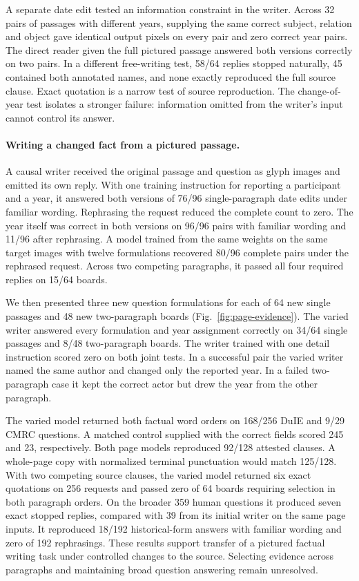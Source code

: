 \documentclass[12pt,a4paper]{article}
\providecommand{\DIFadd}[1]{{\protect\color{blue} \sf #1}} %
\begin{document}
\DIFadd{A separate date edit tested an information constraint in the writer. Across 32 pairs of passages with different years, supplying the same correct subject, relation and object gave identical output pixels on every pair and zero correct year pairs. The direct reader given the full pictured passage answered both versions correctly on two pairs. In a different free-writing test, 58/64 replies stopped naturally, 45 contained both annotated names, and none exactly reproduced the full source clause. Exact quotation is a narrow test of source reproduction. The change-of-year test isolates a stronger failure: information omitted from the writer's input cannot control its answer.
}


\paragraph{\DIFadd{Writing a changed fact from a pictured passage.}}
\DIFadd{A causal writer received the original passage and question as glyph images and emitted its own reply. With one training instruction for reporting a participant and a year, it answered both versions of 76/96 single-paragraph date edits under familiar wording. Rephrasing the request reduced the complete count to zero. The year itself was correct in both versions on 96/96 pairs with familiar wording and 11/96 after rephrasing. A model trained from the same weights on the same target images with twelve formulations recovered 80/96 complete pairs under the rephrased request. Across two competing paragraphs, it passed all four required replies on 15/64 boards.
}

\DIFadd{We then presented three new question formulations for each of 64 new single passages and 48 new two-paragraph boards (Fig.~\ref{fig:page-evidence}). The varied writer answered every formulation and year assignment correctly on 34/64 single passages and 8/48 two-paragraph boards. The writer trained with one detail instruction scored zero on both joint tests. In a successful pair the varied writer named the same author and changed only the reported year. In a failed two-paragraph case it kept the correct actor but drew the year from the other paragraph.
}

\DIFadd{The varied model returned both factual word orders on 168/256 DuIE and 9/29 CMRC questions. A matched control supplied with the correct fields scored 245 and 23, respectively. Both page models reproduced 92/128 attested clauses. A whole-page copy with normalized terminal punctuation would match 125/128. With two competing source clauses, the varied model returned six exact quotations on 256 requests and passed zero of 64 boards requiring selection in both paragraph orders. On the broader 359 human questions it produced seven exact stopped replies, compared with 39 from its initial writer on the same page inputs. It reproduced 18/192 historical-form answers with familiar wording and zero of 192 rephrasings. These results support transfer of a pictured factual writing task under controlled changes to the source. Selecting evidence across paragraphs and maintaining broad question answering remain unresolved.
}
\end{document}
